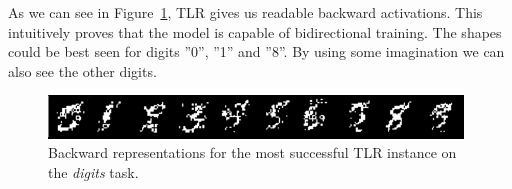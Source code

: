 
As we can see in Figure~\ref{fig:results-tlr-digits-backward}, TLR gives us readable backward activations. This intuitively proves that the model is capable of bidirectional training. The shapes could be best seen for digits ''0'', ''1'' and ''8''. By using some imagination we can also see the other digits. 

\begin{figure}[H]
  \centering
  \includegraphics[width=0.98\textwidth]{img/tlr-digits.png}    
  \caption{Backward representations for the most successful TLR instance on the \emph{digits} task.}
  \label{fig:results-tlr-digits-backward} 
\end{figure}

